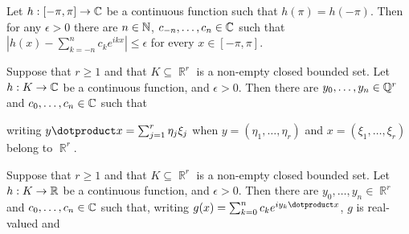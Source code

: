       
 Let $h:[-\pi,\pi]\to\Bbb C$ be a continuous 
function such that $h(\pi)=h(-\pi)$.   Then for any $\epsilon>0$ there 
are $n\in\Bbb N$, $c_{-n},\ldots,c_n\in\Bbb C$ such that 
$|h(x)-\sum_{k=-n}^nc_ke^{ikx}|\le\epsilon$ for every $x\in[-\pi,\pi]$. 
      
      
 Suppose that $r\ge 1$ and that 
$K\subseteq\BbbR^r$ is a non-empty closed bounded set.   Let 
$h:K\to\Bbb C$ be a continuous 
function, and $\epsilon>0$.   Then there are $y_0,\ldots,y_n\in\Bbb Q^r$ 
and $c_0,\ldots,c_n\in\Bbb C$ such that 
      
      
      
\noindent writing $y\dotproduct x=\sum_{j=1}^r\eta_j\xi_j$ when 
$y=(\eta_1,\ldots,\eta_r)$ and $x=(\xi_1,\ldots,\xi_r)$ belong to 
$\BbbR^r$. 
      
      
      
  Suppose that $r\ge 1$ and that 
$K\subseteq\BbbR^r$ is a non-empty closed bounded set.   Let 
$h:K\to\Bbb R$ be a continuous 
function, and $\epsilon>0$.   Then there are $y_0,\ldots,y_n\in\BbbR^r$ 
and $c_0,\ldots,c_n\in\Bbb C$ such that, writing 
$g(x)=\sum_{k=0}^nc_ke^{iy_k\dotproduct x}$, $g$ is real-valued and 
      
